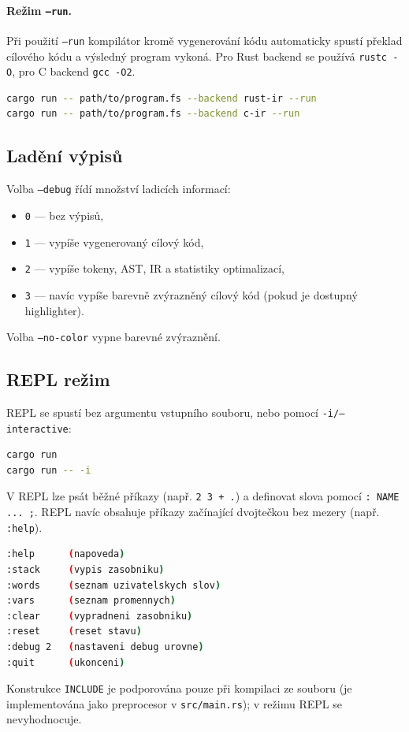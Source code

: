 \paragraph{Režim \texttt{--run}.}
Při použití \texttt{--run} kompilátor kromě vygenerování kódu automaticky spustí
překlad cílového kódu a výsledný program vykoná. Pro Rust backend se používá
\texttt{rustc -O}, pro C backend \texttt{gcc -O2}.
\begin{lstlisting}[language=bash, caption={Kompilace a spuštění}]
cargo run -- path/to/program.fs --backend rust-ir --run
cargo run -- path/to/program.fs --backend c-ir --run
\end{lstlisting}

\subsection{Ladění výpisů}

Volba \texttt{--debug} řídí množství ladicích informací:
\begin{itemize}
	\item \texttt{0} --- bez výpisů,
	\item \texttt{1} --- vypíše vygenerovaný cílový kód,
	\item \texttt{2} --- vypíše tokeny, AST, IR a statistiky optimalizací,
	\item \texttt{3} --- navíc vypíše barevně zvýrazněný cílový kód (pokud je dostupný highlighter).
\end{itemize}

Volba \texttt{--no-color} vypne barevné zvýraznění.

\subsection{REPL režim}

REPL se spustí bez argumentu vstupního souboru, nebo pomocí \texttt{-i/--interactive}:
\begin{lstlisting}[language=bash, caption={Spuštění REPL}]
cargo run
cargo run -- -i
\end{lstlisting}

V REPL lze psát běžné \Roth{} příkazy (např. \texttt{2 3 + .}) a definovat slova
pomocí \texttt{: NAME ... ;}. REPL navíc obsahuje příkazy začínající dvojtečkou
bez mezery (např. \texttt{:help}).

\begin{lstlisting}[language=bash, caption={Základní REPL příkazy}]
:help      (napoveda)
:stack     (vypis zasobniku)
:words     (seznam uzivatelskych slov)
:vars      (seznam promennych)
:clear     (vypradneni zasobniku)
:reset     (reset stavu)
:debug 2   (nastaveni debug urovne)
:quit      (ukonceni)
\end{lstlisting}

Konstrukce \texttt{INCLUDE} je podporována pouze při kompilaci ze souboru
(je implementována jako preprocesor v \texttt{src/main.rs}); v režimu REPL se
nevyhodnocuje.
